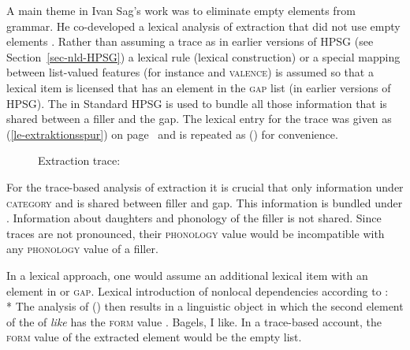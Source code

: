 A main theme in Ivan Sag's work was to eliminate empty elements from grammar. He co-developed a
lexical analysis of extraction that did not use empty elements \citep*{NB94,BMS2001a}. Rather than
assuming a trace as in earlier versions of HPSG (see Section~\ref{sec-nld-HPSG}) a lexical rule
(lexical construction) or a special mapping between list-valued features (for instance \argst and
\textsc{valence}) is assumed so that a lexical item is licensed that has an element in the 
\textsc{gap} list (\slasch in earlier versions of HPSG). The \localf in Standard HPSG is used to
bundle all those information that is shared between a filler and the gap. The lexical entry for the
trace was given as (\ref{le-extraktionsspur}) on page~\pageref{le-extraktionsspur} and is repeated
as () for convenience.
\begin{figure}
\eas
\label{le-extraction-trace-two}
Extraction trace: \\
\zs
\vspace{-2\baselineskip}
\end{figure}%
For the trace-based analysis of extraction it is crucial that only information under
\textsc{category} and \cont is shared between filler and gap. This information is bundled under
\local. Information about daughters and phonology of the filler is not shared. Since traces are not
pronounced, their \textsc{phonology} value would be incompatible with any \textsc{phonology} value of
a filler.\pagebreak

In a lexical approach, one would assume an additional lexical item with an element in \slasch or
\textsc{gap}.
\ea
Lexical introduction of nonlocal dependencies %
according to \citet[]{Sag2012a}:\\*
\z
The analysis of () then results in a linguistic object in which the second element of the
\argstl of \emph{like} has the \textsc{form} value .
\ea
Bagels, I like.
\z
In a trace-based account, the \textsc{form} value of the extracted element would be the empty list.

